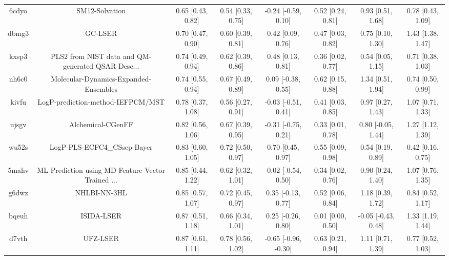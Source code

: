 \documentclass{article}
\begin{document}
\begin{center}
\begin{longtable}{|cccccccc|}
 6cdyo &                                     SM12-Solvation &  0.65 [0.43, 0.82] &  0.54 [0.33, 0.75] &   -0.24 [-0.59, 0.10] &  0.52 [0.24, 0.81] &    0.93 [0.51, 1.68] &     0.78 [0.43, 1.09] \\
 dbmg3 &                                            GC-LSER &  0.70 [0.47, 0.90] &  0.60 [0.39, 0.81] &     0.42 [0.09, 0.76] &  0.47 [0.03, 0.82] &    0.75 [0.10, 1.30] &     1.43 [1.38, 1.47] \\
 kxsp3 &  PLS2 from NIST data and QM-generated QSAR Desc... &  0.74 [0.49, 0.94] &  0.62 [0.39, 0.86] &     0.48 [0.13, 0.81] &  0.36 [0.02, 0.77] &    0.54 [0.05, 1.15] &     0.71 [0.38, 1.03] \\
 nh6c0 &              Molecular-Dynamics-Expanded-Ensembles &  0.74 [0.55, 0.94] &  0.67 [0.49, 0.89] &    0.09 [-0.38, 0.55] &  0.62 [0.15, 0.88] &    1.34 [0.51, 1.94] &     0.74 [0.50, 0.99] \\
 kivfu &                  LogP-prediction-method-IEFPCM/MST &  0.78 [0.37, 1.08] &  0.56 [0.27, 0.91] &   -0.03 [-0.51, 0.41] &  0.41 [0.03, 0.85] &    0.97 [0.27, 1.43] &     1.07 [0.71, 1.33] \\
 ujsgv &                                  Alchemical-CGenFF &  0.82 [0.56, 1.06] &  0.67 [0.39, 0.95] &   -0.31 [-0.75, 0.21] &  0.33 [0.01, 0.78] &   0.80 [-0.05, 1.44] &     1.27 [1.12, 1.39] \\
 wu52s &                        LogP-PLS-ECFC4\_CSsep-Bayer &  0.83 [0.60, 1.05] &  0.72 [0.50, 0.97] &     0.70 [0.45, 0.97] &  0.55 [0.09, 0.98] &    0.54 [0.19, 0.89] &     0.42 [0.16, 0.75] \\
 5mahv &  ML Prediction using MD Feature Vector Trained ... &  0.85 [0.44, 1.22] &  0.62 [0.32, 1.01] &   -0.02 [-0.54, 0.50] &  0.34 [0.02, 0.76] &    0.90 [0.24, 1.40] &     1.07 [0.76, 1.35] \\
 g6dwz &                                       NHLBI-NN-3HL &  0.85 [0.57, 1.07] &  0.72 [0.45, 0.97] &    0.35 [-0.13, 0.77] &  0.52 [0.06, 0.84] &    1.18 [0.39, 1.72] &     0.84 [0.52, 1.17] \\
 bqeuh &                                         ISIDA-LSER &  0.87 [0.51, 1.18] &  0.66 [0.34, 1.01] &    0.25 [-0.26, 0.80] &  0.01 [0.00, 0.50] &  -0.05 [-0.43, 0.48] &     1.33 [1.19, 1.44] \\
 d7vth &                                           UFZ-LSER &  0.87 [0.61, 1.11] &  0.78 [0.56, 1.02] &  -0.65 [-0.96, -0.30] &  0.63 [0.21, 0.94] &    1.11 [0.71, 1.39] &     0.77 [0.52, 1.03] \\

\end{longtable}
\end{center}
\end{document}
